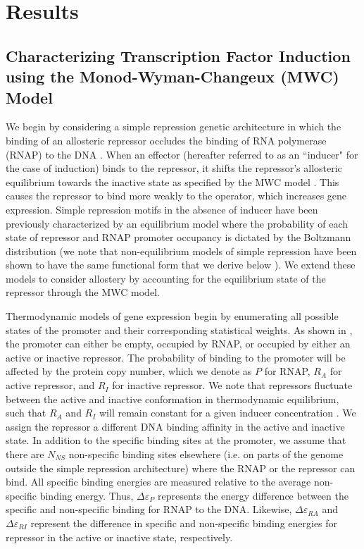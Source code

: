 \section*{Results}

\subsection*{Characterizing Transcription Factor Induction using the Monod-Wyman-Changeux (MWC) Model}

We begin by considering a simple repression genetic
architecture in which the binding of an allosteric repressor occludes the
binding of RNA polymerase (RNAP) to the DNA \citep{Ackers1982,Buchler2003}. When
an effector (hereafter referred to as an ``inducer" for the case of induction)
binds to the repressor, it shifts the repressor's allosteric equilibrium towards
the inactive state as specified by the MWC model \citep{MONOD1965}. This causes
the repressor to bind more weakly to the operator, which increases gene
expression. Simple repression motifs in the absence of inducer have been
previously characterized by an equilibrium model where the probability of each
state of repressor and RNAP promoter occupancy is dictated by the Boltzmann
distribution \citep{Ackers1982, Buchler2003, Vilar2003, Bintu2005a, Garcia2011,
Brewster2014, } (we note that non-equilibrium models of simple repression have
been shown to have the same functional form that we derive below
\citep{Phillips2015a}). We extend these models to consider allostery
by accounting for the equilibrium state of the repressor through the MWC model.

Thermodynamic models of gene expression begin by enumerating all possible states
of the promoter and their corresponding statistical weights. As shown in
, the promoter can either be
empty, occupied by RNAP, or occupied by either an active or inactive repressor. The probability of binding to the promoter will be affected by the protein copy number, which we denote as $P$ for RNAP, $R_{A}$ for active repressor, and $R_{I}$ for inactive repressor. We note that repressors fluctuate between the active and inactive conformation in thermodynamic equilibrium, such that $R_{A}$ and $R_{I}$ will remain constant for a given inducer concentration \citep{MONOD1965}.
We assign the repressor a different DNA binding affinity in the active and
inactive state. In addition to the specific binding sites at the promoter, we
assume that there are $N_{NS}$ non-specific binding sites elsewhere (i.e. on
parts of the genome outside the simple repression architecture) where the RNAP
or the repressor can bind. All specific binding energies are measured relative
to the average non-specific binding energy. Thus, \(\Delta\varepsilon_{P}\) represents the energy difference
between the specific and non-specific binding for RNAP to the DNA. Likewise,
\(\Delta\varepsilon_{RA}\) and \(\Delta\varepsilon_{RI}\) represent the
difference in specific and non-specific binding energies for repressor in the
active or inactive state, respectively.

